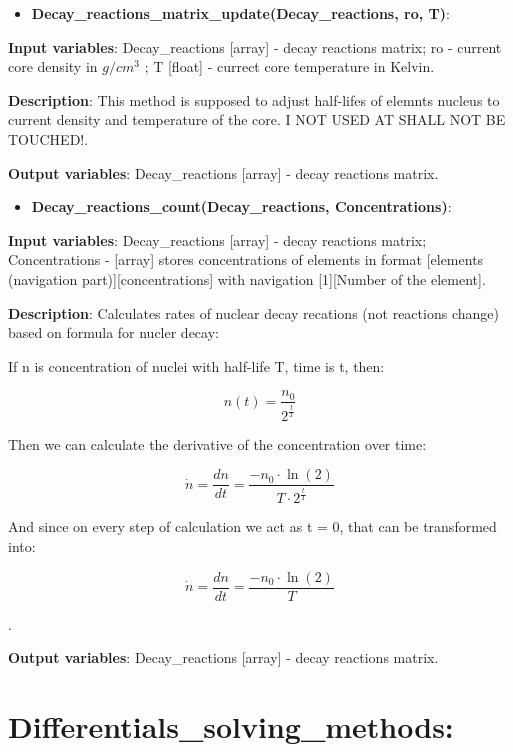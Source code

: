 \documentclass[a4paper,12pt]{article}
\newcommand{\namefunction}[4]{
  \begin{itemize}
    \item \textbf{#1}:
  \end{itemize}
  
  \textbf{Input variables}: #2.
  
  \textbf{Description}: #3.
  
  \textbf{Output variables}: #4.
}
\begin{document}
\vspace{1em}

\namefunction{Decay\_reactions\_matrix\_update(Decay\_reactions, ro, T)}{Decay\_reactions [array] - decay reactions matrix; ro - current core density in $g/cm^3$ ; T [float] - currect core temperature in Kelvin}{This method is supposed to adjust half-lifes of elemnts nucleus to current density and temperature of the core. I NOT USED AT SHALL NOT BE TOUCHED!}{Decay\_reactions [array] - decay reactions matrix}

\vspace{1em}

\namefunction{Decay\_reactions\_count(Decay\_reactions, Concentrations)}{Decay\_reactions [array] - decay reactions matrix; Concentrations - [array] stores concentrations of elements in format [elements (navigation part)][concentrations] with navigation [1][Number of the element]}{Calculates rates of nuclear decay recations (not reactions change) based on formula for nucler decay:

If n is concentration of nuclei with half-life T, time is t, then:

\[
n(t) = \frac{n_0}{2^{\frac{t}{T}}}
\]

Then we can calculate the derivative of the concentration over time:

\[
\dot{n} = \frac{dn}{dt} = \frac{-n_0 \cdot \ln(2)}{T \cdot 2^{\frac{t}{T}}}
\]

And since on every step of calculation we act as t = 0, that can be transformed into:

\[\dot{n} = \frac{dn}{dt} = \frac{-n_0 \cdot \ln(2)}{T}\]

}{Decay\_reactions [array] - decay reactions matrix}

\section{Differentials\_solving\_methods:}

\vspace{1em}
\end{document}
